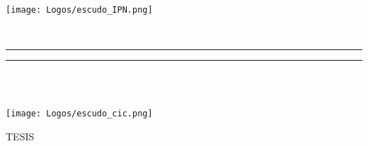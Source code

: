 \begin{titlepage}
        \thispagestyle{empty}
        \begin{minipage}[c][0.17\textheight][c]{0.25\textwidth}
            \begin{center}
                \texttt{[image: Logos/escudo\_IPN.png]}
            \end{center}
        \end{minipage}
        \begin{minipage}[c][0.195\textheight][t]{0.75\textwidth}
            \begin{center}
                \vspace{0.3cm}
                \textsc{\large \univname}\\[0.5cm]
                \vspace{0.3cm}
                \hrule height2.5pt
                \vspace{.2cm}
                \hrule height1pt
                \vspace{.8cm}
                \textsc{\deptname }\\[0.5cm] %
            \end{center}
        \end{minipage}
        \begin{minipage}[c][0.81\textheight][t]{0.25\textwidth}
            \vspace*{5mm}
            \begin{center}
                \hskip2.0mm
                \vrule width1pt height13cm 
                \vspace{5mm}
                \hskip2pt
                \vrule width2.5pt height13cm
                \hskip2mm
                \vrule width1pt height13cm \\
                \vspace{5mm}
                \texttt{[image: Logos/escudo\_cic.png]}
            \end{center}
        \end{minipage}
        \begin{minipage}[c][0.81\textheight][t]{0.75\textwidth}
            \begin{center}
                \vspace{1cm}

                \textsc{\LARGE T\hspace{0.7cm}E\hspace{0.7cm}S\hspace{0.7cm}I\hspace{0.7cm}S}\\[0.5cm]
                {\large\scshape \ttitle}\\[.2in]


\end{center}
\end{minipage}
\end{titlepage}
